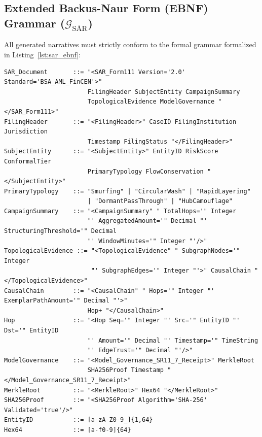 \subsection{\texorpdfstring{Extended Backus-Naur Form (EBNF) Grammar ($\mathcal{G}_{\text{SAR}}$)}{Extended Backus-Naur Form (EBNF) Grammar (G\_SAR)}}
All generated narratives must strictly conform to the formal grammar formalized in Listing~\ref{lst:sar_ebnf}:

\begin{lstlisting}[caption={Extended Backus-Naur Form (EBNF) Grammar for Deterministic SAR Generation ($\mathcal{G}_{\text{SAR}}$).}, label={lst:sar_ebnf}]
SAR_Document       ::= "<SAR_Form111 Version='2.0' Standard='BSA_AML_FinCEN'>"
                       FilingHeader SubjectEntity CampaignSummary
                       TopologicalEvidence ModelGovernance "</SAR_Form111>"
FilingHeader       ::= "<FilingHeader>" CaseID FilingInstitution Jurisdiction 
                       Timestamp FilingStatus "</FilingHeader>"
SubjectEntity      ::= "<SubjectEntity>" EntityID RiskScore ConformalTier 
                       PrimaryTypology FlowConservation "</SubjectEntity>"
PrimaryTypology    ::= "Smurfing" | "CircularWash" | "RapidLayering" 
                       | "DormantPassThrough" | "HubCamouflage"
CampaignSummary    ::= "<CampaignSummary" " TotalHops='" Integer 
                       "' AggregatedAmount='" Decimal "' StructuringThreshold='" Decimal 
                       "' WindowMinutes='" Integer "'/>"
TopologicalEvidence ::= "<TopologicalEvidence" " SubgraphNodes='" Integer 
                        "' SubgraphEdges='" Integer "'>" CausalChain "</TopologicalEvidence>"
CausalChain        ::= "<CausalChain" " Hops='" Integer "' ExemplarPathAmount='" Decimal "'>" 
                       Hop+ "</CausalChain>"
Hop                ::= "<Hop Seq='" Integer "' Src='" EntityID "' Dst='" EntityID 
                       "' Amount='" Decimal "' Timestamp='" TimeString 
                       "' EdgeTrust='" Decimal "'/>"
ModelGovernance    ::= "<Model_Governance_SR11_7_Receipt>" MerkleRoot 
                       SHA256Proof Timestamp "</Model_Governance_SR11_7_Receipt>"
MerkleRoot         ::= "<MerkleRoot>" Hex64 "</MerkleRoot>"
SHA256Proof        ::= "<SHA256Proof Algorithm='SHA-256' Validated='true'/>"
EntityID           ::= [a-zA-Z0-9_]{1,64}
Hex64              ::= [a-f0-9]{64}
\end{lstlisting}

